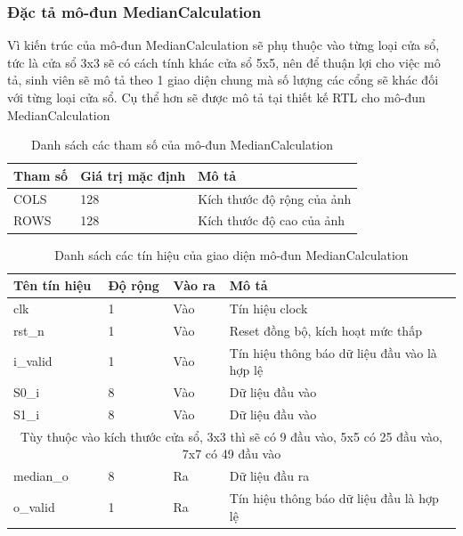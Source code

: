 \subsubsection{Đặc tả mô-đun MedianCalculation}
Vì kiến trúc của mô-đun MedianCalculation sẽ phụ thuộc vào từng loại cửa sổ, tức là cửa sổ 3x3 sẽ có cách tính khác cửa sổ 5x5, nên để thuận lợi cho việc mô tả, sinh viên sẽ mô tả theo 1 giao diện chung mà số lượng các cổng sẽ khác đối với từng loại cửa sổ. Cụ thể hơn sẽ được mô tả tại thiết kế RTL cho mô-đun MedianCalculation
\begin{table}[!ht]
    \centering
    \renewcommand{\arraystretch}{1.3} %
        \caption{Danh sách các tham số của mô-đun MedianCalculation}
    \begin{tabular}{|p{3cm} p{4cm} p{8cm}|}
        \hline
        \rowcolor{gray!30}
        \textbf{Tham số } & \textbf{Giá trị mặc định}  & \textbf{Mô tả} \\
        \hline
        COLS & 128 & Kích thước độ rộng của ảnh
        \\ \hline
        ROWS & 128 & Kích thước độ cao của ảnh
        \\ \hline
    \end{tabular}

    \label{tab:paramListMedianCalculation}
\end{table}


\begin{table}[h]
    \centering
    \renewcommand{\arraystretch}{1.3} %
        \caption{Danh sách các tín hiệu của giao diện mô-đun MedianCalculation}
    \begin{tabular}{|p{3cm} p{2cm} p{2cm} p{8cm}|}
        \hline
        \rowcolor{gray!30}
        \textbf{Tên tín hiệu} & \textbf{Độ rộng} & \textbf{Vào ra} & \textbf{Mô tả} \\
        \hline
        clk & 1 & Vào & Tín hiệu clock \\
        \hline
        rst\_n & 1 & Vào & Reset đồng bộ, kích hoạt mức thấp \\
        \hline
        i\_valid & 1 & Vào & Tín hiệu thông báo dữ liệu đầu vào là hợp lệ
        \\ \hline
        S0\_i & 8 & Vào & Dữ liệu đầu vào
        \\ \hline
        S1\_i & 8 & Vào & Dữ liệu đầu vào
        \\
        \hline
        \multicolumn{4}{|c|}{Tùy thuộc vào kích thước cửa sổ, 3x3 thì sẽ có 9 đầu vào, 5x5 có 25 đầu vào, 7x7 có 49 đầu vào}
        \\ \hline
        median\_o & 8 & Ra & Dữ liệu đầu ra
        \\ \hline
        o\_valid & 1& Ra & Tín hiệu thông báo dữ liệu đầu là hợp lệ
        \\ \hline
    \end{tabular}

    \label{tab:signalListMedianCalculation}
\end{table}

